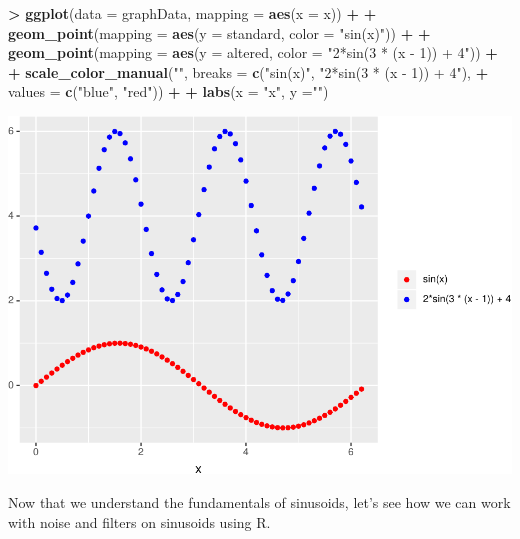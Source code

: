 \documentclass[]{krantz}
\makeatletter
\newenvironment{Shaded}{\begin{snugshade}}{\end{snugshade}}
\newcommand{\DataTypeTok}[1]{\textcolor[rgb]{0.27,0.27,0.27}{#1}}
\newcommand{\KeywordTok}[1]{\textcolor[rgb]{0.27,0.27,0.27}{\textbf{#1}}}
\newcommand{\NormalTok}[1]{#1}
\newcommand{\OperatorTok}[1]{\textcolor[rgb]{0.43,0.43,0.43}{\textbf{#1}}}
\newcommand{\StringTok}[1]{\textcolor[rgb]{0.5,0.5,0.5}{#1}}
\newenvironment{kframe}{%
\medskip{}
\setlength{\fboxsep}{.8em}
 \def\at@end@of@kframe{}%
 \ifinner\ifhmode%
  \def\at@end@of@kframe{\end{minipage}}%
  \begin{minipage}{\columnwidth}%
 \fi\fi%
 \def\FrameCommand##1{\hskip\@totalleftmargin \hskip-\fboxsep
 \colorbox{shadecolor}{##1}\hskip-\fboxsep
     \hskip-\linewidth \hskip-\@totalleftmargin \hskip\columnwidth}%
 \MakeFramed {\advance\hsize-\width
   \@totalleftmargin\z@ \linewidth\hsize
   \@setminipage}}%
 {\par\unskip\endMakeFramed%
 \at@end@of@kframe}
\renewenvironment{Shaded}{\begin{kframe}}{\end{kframe}}
\makeatother
\begin{document}
\begin{Shaded}
\begin{Highlighting}[]
\OperatorTok{>}\StringTok{ }\KeywordTok{ggplot}\NormalTok{(}\DataTypeTok{data =}\NormalTok{ graphData, }\DataTypeTok{mapping =} \KeywordTok{aes}\NormalTok{(}\DataTypeTok{x =}\NormalTok{ x)) }\OperatorTok{+}\StringTok{ }
\OperatorTok{+}\StringTok{   }\KeywordTok{geom_point}\NormalTok{(}\DataTypeTok{mapping =} \KeywordTok{aes}\NormalTok{(}\DataTypeTok{y =}\NormalTok{ standard, }\DataTypeTok{color =} \StringTok{"sin(x)"}\NormalTok{)) }\OperatorTok{+}\StringTok{ }
\OperatorTok{+}\StringTok{   }\KeywordTok{geom_point}\NormalTok{(}\DataTypeTok{mapping =} \KeywordTok{aes}\NormalTok{(}\DataTypeTok{y =}\NormalTok{ altered, }\DataTypeTok{color =} \StringTok{"2*sin(3 * (x - 1)) + 4"}\NormalTok{)) }\OperatorTok{+}\StringTok{ }
\OperatorTok{+}\StringTok{   }\KeywordTok{scale_color_manual}\NormalTok{(}\StringTok{""}\NormalTok{, }\DataTypeTok{breaks =} \KeywordTok{c}\NormalTok{(}\StringTok{"sin(x)"}\NormalTok{, }\StringTok{"2*sin(3 * (x - 1)) + 4"}\NormalTok{), }
\OperatorTok{+}\StringTok{                      }\DataTypeTok{values =} \KeywordTok{c}\NormalTok{(}\StringTok{"blue"}\NormalTok{, }\StringTok{"red"}\NormalTok{)) }\OperatorTok{+}\StringTok{ }
\OperatorTok{+}\StringTok{   }\KeywordTok{labs}\NormalTok{(}\DataTypeTok{x =} \StringTok{"x"}\NormalTok{, }\DataTypeTok{y =}\StringTok{""}\NormalTok{)}
\end{Highlighting}
\end{Shaded}

\includegraphics{bookdown_files/figure-latex/unnamed-chunk-308-1.pdf}

Now that we understand the fundamentals of sinusoids, let's see how we can work with noise and filters on sinusoids using R.
\end{document}
